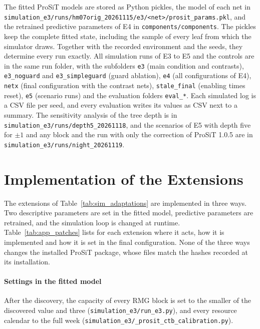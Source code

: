 The fitted ProSiT models are stored as Python pickles, the model of each net in
\nolinkurl{simulation_e3/runs/hm07orig_20261115/e3/<net>/prosit_params.pkl}, and the
retrained predictive parameters of E4 in \nolinkurl{components/components}. The pickles keep the
complete fitted state, including the sample of every leaf from which the simulator
draws.
Together with the recorded environment and the seeds, they determine every run
exactly. All simulation runs of E3 to E5 and the controls are in the same
run folder, with the subfolders \texttt{e3} (main condition and contrasts), \nolinkurl{e3_noguard} and
\nolinkurl{e3_simpleguard} (guard ablation), \texttt{e4} (all configurations of E4),
\texttt{netx} (final configuration with the contrast nets), \nolinkurl{stale_final}
(enabling times reset), \texttt{e5} (scenario runs) and the evaluation folders
\nolinkurl{eval_*}. Each simulated log is a CSV file per seed, and every evaluation
writes its values as CSV next to a summary. The sensitivity analysis of the tree
depth is in \nolinkurl{simulation_e3/runs/depth5_20261118}, and the scenarios of E5
with depth five for $\pm 1$ and any block and the run with only the correction of
ProSiT 1.0.5 are in \nolinkurl{simulation_e3/runs/night_20261119}.

\section{Implementation of the Extensions}
\label{app:implementation}

The extensions of Table~\ref{tab:sim_adaptations} are implemented in three ways.
Two descriptive parameters are set in the fitted model, predictive parameters are
retrained, and the simulation loop is changed at runtime. Table~\ref{tab:app_patches}
lists for each extension where it acts, how it is implemented and how it is set in
the final configuration. None of the three ways changes the installed ProSiT package,
whose files match the hashes recorded at its installation.

\paragraph{Settings in the fitted model} After the discovery, the capacity of every
RMG block is set to the smaller of the discovered value and three
(\nolinkurl{simulation_e3/run_e3.py}), and every resource calendar to the full week
(\nolinkurl{simulation_e3/_prosit_ctb_calibration.py}).

